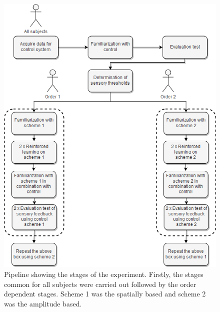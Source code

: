 \begin{figure}[H]                 
	\includegraphics[width=.65\textwidth]{figures/std_design}
	\caption{Pipeline showing the stages of the experiment. Firstly, the stages common for all subjects were carried out followed by the order dependent stages. Scheme 1 was the spatially based and scheme 2 was the amplitude based.}
	\label{fig:std} 
\end{figure}